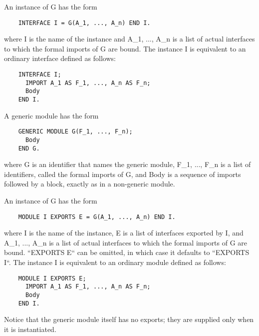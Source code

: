 \documentclass[10pt]{article}
\begin{document}
  An instance of G has the form 
\begin{verbatim}
    INTERFACE I = G(A_1, ..., A_n) END I.
\end{verbatim}
 where I is the name of the instance and A\_1, ..., A\_n is a list of actual interfaces to which the formal imports of G are bound. The instance I is equivalent to an ordinary interface defined as follows: 
\begin{verbatim}
    INTERFACE I;
      IMPORT A_1 AS F_1, ..., A_n AS F_n;
      Body
    END I.
\end{verbatim}



 A generic module has the form 
\begin{verbatim}
    GENERIC MODULE G(F_1, ..., F_n);
      Body
    END G.
\end{verbatim}
 where G is an identifier that names the generic module, F\_1, ..., F\_n is a list of identifiers, called the formal imports of G, and Body is a sequence of imports followed by a block, exactly as in a non-generic module. 


  An instance of G has the form 
\begin{verbatim}
    MODULE I EXPORTS E = G(A_1, ..., A_n) END I.
\end{verbatim}
 where I is the name of the instance, E is a list of interfaces exported by I, and A\_1, ..., A\_n is a list of actual interfaces to which the formal imports of G are bound. ``EXPORTS E`` can be omitted, in which case it defaults to ``EXPORTS I``. The instance I is equivalent to an ordinary module defined as follows: 
\begin{verbatim}
    MODULE I EXPORTS E;
      IMPORT A_1 AS F_1, ..., A_n AS F_n;
      Body
    END I.
\end{verbatim}
 Notice that the generic module itself has no exports; they are supplied only when it is instantiated. 
\end{document}
